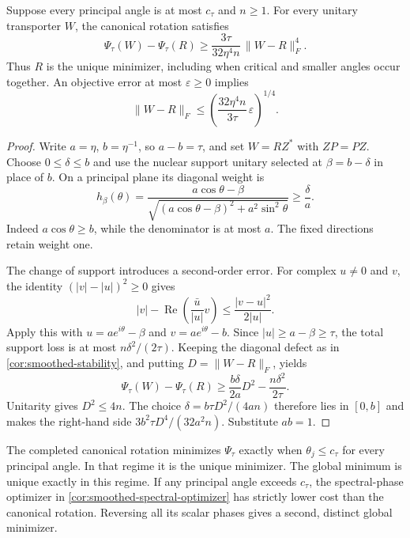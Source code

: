\begin{theorem}
\label{thm:smoothed-quartic-stability}
Suppose every principal angle is at most $c_\tau$ and $n\geq1$.
For every unitary transporter $W$, the canonical rotation satisfies
\[
 \Psi_\tau(W)-\Psi_\tau(R)
 \geq \frac{3\tau}{32\eta^4n}\,\|W-R\|_F^4.
\]
Thus $R$ is the unique minimizer, including when critical and smaller
angles occur together. An objective error at most $\varepsilon\geq0$
implies
\[
 \|W-R\|_F\leq
 \left(\frac{32\eta^4n}{3\tau}\,\varepsilon\right)^{1/4}.
\]
\end{theorem}

\begin{proof}
Write $a=\eta$, $b=\eta^{-1}$, so $a-b=\tau$, and set
$W=RZ^*$ with $ZP=PZ$. Choose $0\leq\delta\leq b$ and use the
nuclear support unitary selected at $\beta=b-\delta$ in place of $b$.
On a principal plane its diagonal weight is
\[
 h_\beta(\theta)=
 \frac{a\cos\theta-\beta}
      {\sqrt{(a\cos\theta-\beta)^2+a^2\sin^2\theta}}
 \geq \frac{\delta}{a}.
\]
Indeed $a\cos\theta\geq b$, while the denominator is at most $a$.
The fixed directions retain weight one.

The change of support introduces a second-order error. For complex
$u\ne0$ and $v$, the identity $(|v|-|u|)^2\geq0$ gives
\[
 |v|-\operatorname{Re}\left(\frac{\bar u}{|u|}v\right)
 \leq \frac{|v-u|^2}{2|u|}.
\]
Apply this with $u=ae^{i\theta}-\beta$ and $v=ae^{i\theta}-b$.
Since $|u|\geq a-\beta\geq\tau$, the total support loss is at most
$n\delta^2/(2\tau)$. Keeping the diagonal defect as in
\cref{cor:smoothed-stability}, and putting $D=\|W-R\|_F$, yields
\[
 \Psi_\tau(W)-\Psi_\tau(R)
 \geq \frac{b\delta}{2a}D^2-\frac{n\delta^2}{2\tau}.
\]
Unitarity gives $D^2\leq4n$. The choice
$\delta=b\tau D^2/(4an)$ therefore lies in $[0,b]$ and makes the
right-hand side $3b^2\tau D^4/(32a^2n)$. Substitute $ab=1$.
\end{proof}

\begin{corollary}
\label{cor:smoothed-canonical-cutoff}
The completed canonical rotation minimizes $\Psi_\tau$ exactly when
$\theta_j\leq c_\tau$ for every principal angle. In that regime it is
the unique minimizer. The global minimum is unique exactly in this regime.
If any principal angle exceeds $c_\tau$, the spectral-phase optimizer in \cref{cor:smoothed-spectral-optimizer} has
strictly lower cost than the canonical rotation. Reversing all its scalar
phases gives a second, distinct global minimizer.
\end{corollary}

